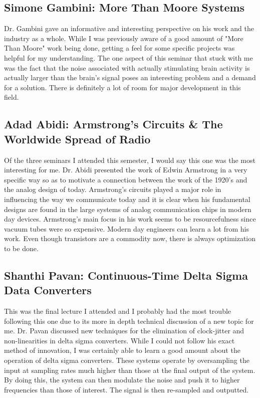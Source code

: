 \documentclass[journal]{IEEEtran}
\begin{document}
\subsection{Simone Gambini: More Than Moore Systems}
Dr. Gambini gave an informative and interesting perspective on his work and the industry as a whole. While I was previously aware of a good amount of "More Than Moore" work being done, getting a feel for some specific projects was helpful for my understanding. The one aspect of this seminar that stuck with me was the fact that the noise associated with actually stimulating brain activity is actually larger than the brain's signal poses an interesting problem and a demand for a solution. There is definitely a lot of room for major development in this field.

\subsection{Adad Abidi: Armstrong's Circuits \& The Worldwide Spread of Radio}
Of the three seminars I attended this semester, I would say this one was the most interesting for me. Dr. Abidi presented the work of Edwin Armstrong in a very specific way so as to motivate a connection between the work of the 1920's and the analog design of today. Armstrong's circuits played a major role in influencing the way we communicate today and it is	clear when his fundamental designs are found in the large systems of analog communication chips in modern day devices. Armstrong's main focus in his work seems to be resourcefulness since vacuum tubes were so expensive. Modern day engineers can learn a lot from his work. Even though transistors are a commodity now, there is always optimization to be done.

\subsection{Shanthi Pavan: Continuous-Time Delta Sigma Data Converters}
This was the final lecture I attended and I probably had the most trouble following this one due to its more in depth technical discussion of a new topic for me. Dr. Pavan discussed new techniques for the elimination of clock-jitter and non-linearities in delta sigma converters. While I could not follow his exact method of innovation, I was certainly able to learn a good amount about the operation of delta sigma converters. These systems operate by oversampling the input at sampling rates much higher than those at the final output of the system. By doing this, the system can then modulate the noise and push it to higher frequencies than those of interest. The signal is then re-sampled and outputted.
\end{document}
